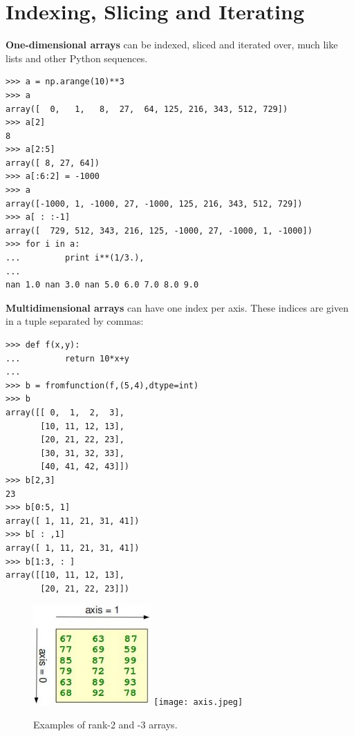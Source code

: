 \documentclass[12pt]{article}
\begin{document}
\section{Indexing, Slicing and Iterating}
\textbf{One-dimensional arrays} can be indexed, sliced and iterated over, much like lists and other Python sequences.
\footnotesize
\begin{Verbatim}[frame=single]
>>> a = np.arange(10)**3
>>> a
array([  0,   1,   8,  27,  64, 125, 216, 343, 512, 729])
>>> a[2]
8
>>> a[2:5]
array([ 8, 27, 64])
>>> a[:6:2] = -1000    
>>> a
array([-1000, 1, -1000, 27, -1000, 125, 216, 343, 512, 729])
>>> a[ : :-1]   
array([  729, 512, 343, 216, 125, -1000, 27, -1000, 1, -1000])
>>> for i in a:
...         print i**(1/3.),
...
nan 1.0 nan 3.0 nan 5.0 6.0 7.0 8.0 9.0
\end{Verbatim}
\normalsize
\textbf{Multidimensional arrays} can have one index per axis. These indices are given in a tuple separated by commas:
\footnotesize
\begin{Verbatim}[frame=single]
>>> def f(x,y):
...         return 10*x+y
...
>>> b = fromfunction(f,(5,4),dtype=int)
>>> b
array([[ 0,  1,  2,  3],
       [10, 11, 12, 13],
       [20, 21, 22, 23],
       [30, 31, 32, 33],
       [40, 41, 42, 43]])
>>> b[2,3]
23
>>> b[0:5, 1]                       
array([ 1, 11, 21, 31, 41])
>>> b[ : ,1]                        
array([ 1, 11, 21, 31, 41])
>>> b[1:3, : ]                   
array([[10, 11, 12, 13],
       [20, 21, 22, 23]])
\end{Verbatim}
\normalsize
\begin{figure}[ht]
\centerline{\includegraphics[width=0.4\textwidth]{axis1.jpeg}\hspace{0.2in}
\texttt{[image: axis.jpeg]}}
\caption{Examples of rank-2 and -3 arrays.}
\end{figure}
\end{document}
